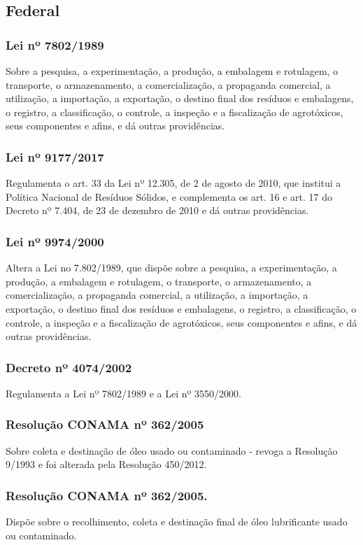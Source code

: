 \begin{subapend}
	\subsection{Federal}
	\begin{subsubapend}
		\item \subsubsection{Lei nº 7802/1989}
		Sobre a pesquisa, a experimentação, a produção, a embalagem e rotulagem, o transporte, o armazenamento, a comercialização, a propaganda comercial, a utilização, a importação, a exportação, o destino final dos resíduos e embalagens, o registro, a classificação, o controle, a inspeção e a fiscalização de agrotóxicos, seus componentes e afins, e dá outras providências.
		\subsubsection{Lei nº 9177/2017}
		Regulamenta o art. 33 da Lei nº 12.305, de 2 de agosto de 2010, que institui a Política Nacional de Resíduos Sólidos, e complementa os art. 16 e art. 17 do Decreto nº 7.404, de 23 de dezembro de 2010 e dá outras providências.
		\subsubsection{Lei nº 9974/2000}
		Altera a Lei no 7.802/1989, que dispõe sobre a pesquisa, a experimentação, a produção, a embalagem e rotulagem, o transporte, o armazenamento, a comercialização, a propaganda comercial, a utilização, a importação, a exportação, o destino final dos resíduos e embalagens, o registro, a classificação, o controle, a inspeção e a fiscalização de agrotóxicos, seus componentes e afins, e dá outras providências.
		\subsubsection{Decreto nº 4074/2002}
		Regulamenta a Lei nº 7802/1989 e a Lei nº 3550/2000.
		\subsubsection{Resolução CONAMA nº 362/2005}
		Sobre coleta e destinação de óleo usado ou contaminado - revoga a Resolução 9/1993 e foi alterada pela Resolução 450/2012.
		\subsubsection{Resolução CONAMA nº 362/2005.}
		Dispõe sobre o recolhimento, coleta e destinação final de óleo lubrificante usado ou contaminado.

\end{subsubapend}
\end{subapend}
